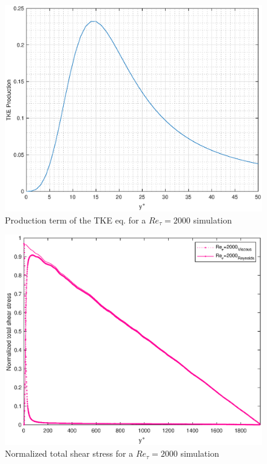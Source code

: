 \begin{figure}
\begin{center}
\includegraphics[scale=0.55]{grafici/tke_prod_2000.eps}
\caption{Production term of the TKE eq. for a $Re_{\tau}=2000$ simulation}
\label{tke:prod:2000}
\end{center} 
\end{figure}

\begin{figure}
\begin{center}
\includegraphics[scale=0.55]{grafici/stresses_2000.eps}
\caption{Normalized total shear stress for a $Re_{\tau}=2000$ simulation}
\label{stresses:2000}
\end{center} 
\end{figure}